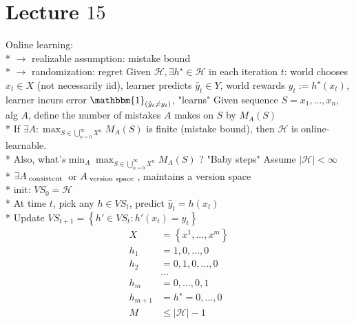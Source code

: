 \documentclass{article}
\begin{document}
\section{Lecture $15$} 
Online learning:
\\* $\to $ realizable assumption: mistake bound
\\* $\to $ randomization: regret
\newline \newline
Given $\mathcal{H}, \exists h^\star  \in \mathcal{H}$ in each iteration $t $: world chooses $x_{t} \in X $ (not necessarily iid), learner predicts $\hat{y}_{t} \in Y $, world rewards $y_{t} := h^\star \left(x_{t}\right)$, learner incurs error $\mathbbm{1}_{\left(\hat{y}_{t} \neq  y_{t}\right)}$, "learns"
\newline \newline
Given sequence $S  = x_{1}, ..., x_{n}$, alg $A $, define the number of mistakes $A $ makes on $S $ by $M_{A}\left(S\right)$
\\* If $\exists A: \displaystyle\max_{S \in \displaystyle\bigcup _{n=0}^{\infty} X^{n}} M_{A}\left(S\right)$ is finite (mistake bound), then $\mathcal{H}$ is online-learnable.
\\* Also, what'$s \displaystyle\min_{A} \displaystyle\max_{S \in \displaystyle\bigcup _{n=0}^{\infty} X^{n}} M_{A}\left(S\right)$ ?
\newline \newline
"Baby steps" Assume $| \mathcal{H} | < \infty$
\\* $\exists A_{\text{\;consistent\;}}$ or $A_{\text{\;version space\;}}$, maintains a version space
\\* init: $VS_{0} = \mathcal{H}$
\\* At time $t $, pick any $h  \in VS_{t}$, predict $\hat{y}_{t} = h\left(x_{t}\right)$
\\* Update $VS_{t+1} = \left\{h' \in VS_{t} : h'\left(x_{t}\right) = y_{t}\right\}$
\newline \newline
\begin{align*}
X  &= \left\{x^{1}, ..., x^{m}\right\}
\\ h_{1} &= 1, 0, ..., 0
\\ h_{2} &= 0, 1, 0, ..., 0
\\ &...
\\ h_{m} &= 0, ..., 0, 1
\\ h_{m+1} &= h^\star  = 0, ..., 0
\\ M  &\leq  \left|  \mathcal{H}  \right| - 1
\end{align*}
\end{document}
